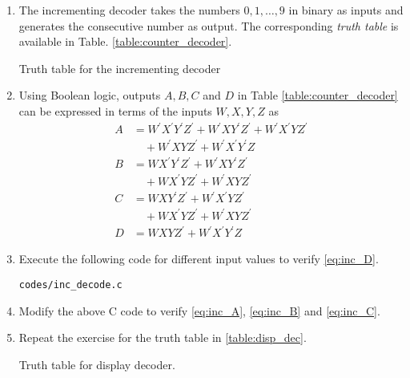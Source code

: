 \renewcommand{\theequation}{\theenumi}
\renewcommand{\thefigure}{\theenumi}
\begin{enumerate}[label=\thesection.\arabic*.,ref=\thesection.\theenumi]

\item The incrementing decoder   takes the numbers $0,1,\dots,9$ in binary as inputs and generates
the consecutive number as output.  The corresponding {\em truth table} is available in Table. \ref{table:counter_decoder}.
\begin{table}[!h]
\centering

\caption{Truth table for the incrementing decoder}
\label{table:counter_decoder}
\end{table}
\item Using Boolean logic, outputs $A, B, C$ and $D$  in Table \ref{table:counter_decoder} can be expressed in terms of the inputs $W,X,Y,Z$ as
%
\begin{align}
\label{eq:inc_A}
A &= W^{\prime}X^{\prime}Y^{\prime}Z^{\prime} + W^{\prime}XY^{\prime}Z^{\prime}
+W^{\prime}X^{\prime}YZ^{\prime}
\nonumber \\
 & \quad +W^{\prime}XYZ^{\prime}
+W^{\prime}X^{\prime}Y^{\prime}Z
\\
\label{eq:inc_B}
B &= WX^{\prime}Y^{\prime}Z^{\prime} + W^{\prime}XY^{\prime}Z^{\prime}
\nonumber \\ 
& \quad 
+WX^{\prime}YZ^{\prime}
+W^{\prime}XYZ^{\prime}
\\
\label{eq:inc_C}
C &= WXY^{\prime}Z^{\prime} + W^{\prime}X^{\prime}YZ^{\prime}
\nonumber \\ 
& \quad 
+WX^{\prime}YZ^{\prime}
+W^{\prime}XYZ^{\prime}
\\
D &= WXYZ^{\prime} + W^{\prime}X^{\prime}Y^{\prime}Z
\label{eq:inc_D}
\end{align}
\item Execute the following code for different input values to verify \eqref{eq:inc_D}.
\begin{lstlisting}
codes/inc_decode.c
\end{lstlisting}
\item Modify the above C code to verify \eqref{eq:inc_A}, \eqref{eq:inc_B}
and \eqref{eq:inc_C}.
%
\item Repeat the exercise for the truth table in \ref{table:disp_dec}.
%
\begin{table}
\centering

\caption{Truth table for display decoder.}
\label{table:disp_dec}
\end{table}

\end{enumerate}
%
%
